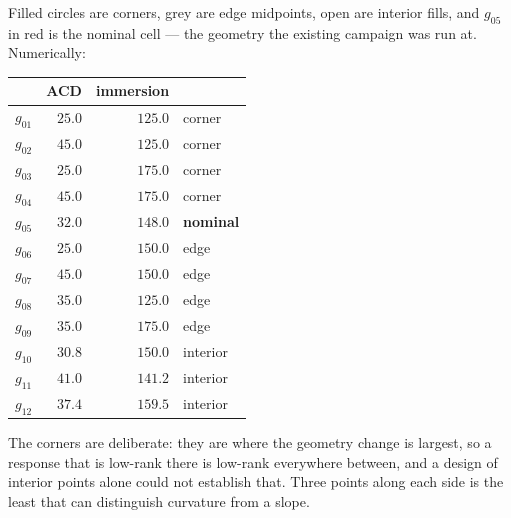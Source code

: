 \documentclass[11pt,a4paper]{article}
\theoremstyle{plain}
\theoremstyle{definition}
\theoremstyle{remark}
\begin{document}
\begin{center}
\end{center}

\noindent
Filled circles are corners, grey are edge midpoints, open are interior fills,
and $g_{05}$ in red is the nominal cell --- the geometry the existing campaign
was run at. Numerically:
\begin{center}
\small
\begin{tabular}{@{}lrrl@{}}
\toprule
& ACD & immersion & \\
\midrule
$g_{01}$ & $25.0$ & $125.0$ & corner \\
$g_{02}$ & $45.0$ & $125.0$ & corner \\
$g_{03}$ & $25.0$ & $175.0$ & corner \\
$g_{04}$ & $45.0$ & $175.0$ & corner \\
$g_{05}$ & $32.0$ & $148.0$ & \textbf{nominal} \\
$g_{06}$ & $25.0$ & $150.0$ & edge \\
$g_{07}$ & $45.0$ & $150.0$ & edge \\
$g_{08}$ & $35.0$ & $125.0$ & edge \\
$g_{09}$ & $35.0$ & $175.0$ & edge \\
$g_{10}$ & $30.8$ & $150.0$ & interior \\
$g_{11}$ & $41.0$ & $141.2$ & interior \\
$g_{12}$ & $37.4$ & $159.5$ & interior \\
\bottomrule
\end{tabular}
\end{center}
The corners are deliberate: they are where the geometry change is largest, so a
response that is low-rank there is low-rank everywhere between, and a design of
interior points alone could not establish that. Three points along each side is
the least that can distinguish curvature from a slope.
\end{document}

